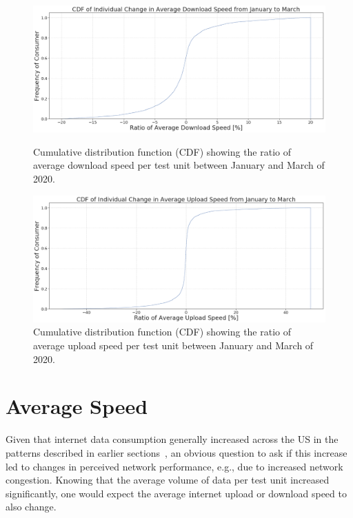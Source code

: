 \documentclass[conference,10pt]{IEEEtran}
\begin{document}
\begin{figure}[t]
  \begin{minipage}[t]{0.490\linewidth}
    \centering
    \includegraphics[width=0.98\linewidth]{figs/downspeed.PNG}
    \caption{Cumulative distribution function (CDF) showing the ratio of average download speed per test unit between January and March of 2020.}
    \label{fig:downloadspeed2020}
  \end{minipage}
  \hspace*{\fill}
  \begin{minipage}[t]{0.490\linewidth}
    \centering
    \includegraphics[width=0.98\linewidth]{figs/uploadspeed.PNG}
    \caption{Cumulative distribution function (CDF) showing the ratio of average upload speed per test unit between January and March of 2020.}
    \label{fig:uploadspeed2020}
  \end{minipage}
\end{figure}

\section{Average Speed}\label{sec:average-speed}

Given that internet data consumption generally increased across the \gls{US} in the patterns described in earlier sections~\cite{feldmann2020lockdown,liu2020characterizing}, an obvious question to ask if this increase led to changes in perceived network performance, e.g., due to increased network congestion. Knowing that the average volume of data per test unit increased significantly, one would expect the average internet upload or download speed to also change.
\end{document}
